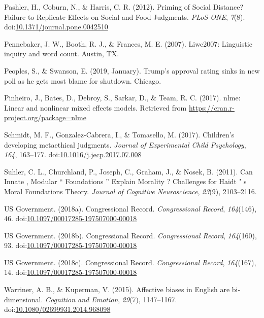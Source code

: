 \documentclass[english,,man]{apa6}
\begin{document}
\leavevmode\hypertarget{ref-Pashler2012}{}%
Pashler, H., Coburn, N., \& Harris, C. R. (2012). Priming of Social Distance? Failure to Replicate Effects on Social and Food Judgments. \emph{PLoS ONE}, \emph{7}(8). doi:\href{https://doi.org/10.1371/journal.pone.0042510}{10.1371/journal.pone.0042510}

\leavevmode\hypertarget{ref-Pennebaker2007}{}%
Pennebaker, J. W., Booth, R. J., \& Frances, M. E. (2007). Liwc2007: Linguistic inquiry and word count. Austin, TX.

\leavevmode\hypertarget{ref-Peoples2019}{}%
Peoples, S., \& Swanson, E. (2019, January). Trump's approval rating sinks in new poll as he gets most blame for shutdown. Chicago.

\leavevmode\hypertarget{ref-Pinheiro2017}{}%
Pinheiro, J., Bates, D., Debroy, S., Sarkar, D., \& Team, R. C. (2017). nlme: Linear and nonlinear mixed effects models. Retrieved from \url{https://cran.r-project.org/package=nlme}

\leavevmode\hypertarget{ref-Schmidt2017}{}%
Schmidt, M. F., Gonzalez-Cabrera, I., \& Tomasello, M. (2017). Children's developing metaethical judgments. \emph{Journal of Experimental Child Psychology}, \emph{164}, 163--177. doi:\href{https://doi.org/10.1016/j.jecp.2017.07.008}{10.1016/j.jecp.2017.07.008}

\leavevmode\hypertarget{ref-Suhler2011}{}%
Suhler, C. L., Churchland, P., Joseph, C., Graham, J., \& Nosek, B. (2011). Can Innate , Modular `` Foundations '' Explain Morality ? Challenges for Haidt ʼ s Moral Foundations Theory. \emph{Journal of Cognitive Neuroscience}, \emph{23}(9), 2103--2116.

\leavevmode\hypertarget{ref-USGovernment2018b}{}%
US Government. (2018a). Congressional Record. \emph{Congressional Record}, \emph{164}(146), 46. doi:\href{https://doi.org/10.1097/00017285-197507000-00018}{10.1097/00017285-197507000-00018}

\leavevmode\hypertarget{ref-USGovernment2018}{}%
US Government. (2018b). Congressional Record. \emph{Congressional Record}, \emph{164}(160), 93. doi:\href{https://doi.org/10.1097/00017285-197507000-00018}{10.1097/00017285-197507000-00018}

\leavevmode\hypertarget{ref-USGovernment2018a}{}%
US Government. (2018c). Congressional Record. \emph{Congressional Record}, \emph{164}(167), 14. doi:\href{https://doi.org/10.1097/00017285-197507000-00018}{10.1097/00017285-197507000-00018}

\leavevmode\hypertarget{ref-Warriner2015}{}%
Warriner, A. B., \& Kuperman, V. (2015). Affective biases in English are bi-dimensional. \emph{Cognition and Emotion}, \emph{29}(7), 1147--1167. doi:\href{https://doi.org/10.1080/02699931.2014.968098}{10.1080/02699931.2014.968098}
\end{document}
